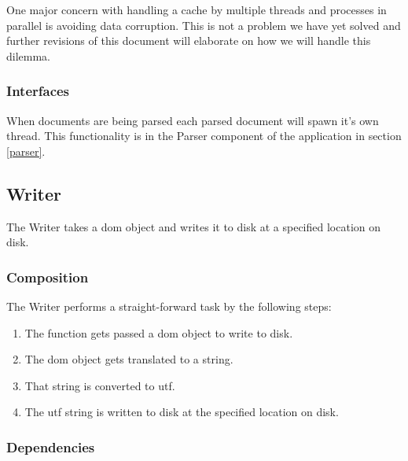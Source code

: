 One major concern with handling a cache by multiple threads and processes in parallel is avoiding data corruption.
This is not a problem we have yet solved and further revisions of this document will elaborate on how we will handle this dilemma.

\subsubsection{Interfaces}

When documents are being parsed each parsed document will spawn it's own thread.
This functionality is in the Parser component of the application in section \ref{parser}.

\subsection{Writer}
\label{writer}

The Writer takes a \gls{dom} object and writes it to disk at a specified location on disk.

\subsubsection{Composition}

The Writer performs a straight-forward task by the following steps:

\begin{enumerate}
	\item The function gets passed a \gls{dom} object to write to disk.
    \item The \gls{dom} object gets translated to a string.
    \item That string is converted to \gls{utf}.
    \item The \gls{utf} string is written to disk at the specified location on disk.
\end{enumerate}

\subsubsection{Dependencies}

